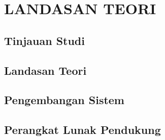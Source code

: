 \chapter{LANDASAN TEORI}

%
\vspace{4.5pt}

\section{Tinjauan Studi}

\section{Landasan Teori}

\section{Pengembangan Sistem}

\section{Perangkat Lunak Pendukung}

\newpage
